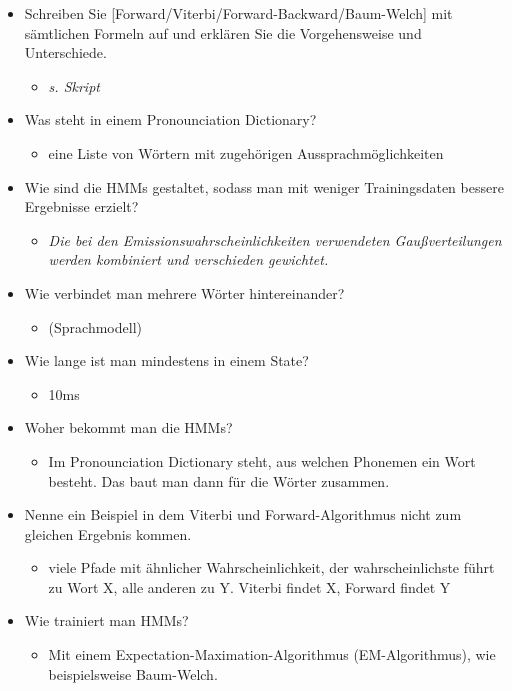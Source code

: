 \documentclass[11pt]{article}
\begin{document}
\begin{itemize}
\begin{itemize}
\end{itemize}
\item Schreiben Sie [Forward/Viterbi/Forward-Backward/Baum-Welch] mit sämtlichen Formeln auf und erklären Sie die Vorgehensweise und Unterschiede.
\begin{itemize}
\item \emph{s. Skript}
\end{itemize}
\item Was steht in einem Pronounciation Dictionary?
\begin{itemize}
\item eine Liste von Wörtern mit zugehörigen Aussprachmöglichkeiten
\end{itemize}
\item Wie sind die HMMs gestaltet, sodass man mit weniger Trainingsdaten bessere Ergebnisse erzielt?
\begin{itemize}
\item \emph{Die bei den Emissionswahrscheinlichkeiten verwendeten Gaußverteilungen werden kombiniert und verschieden gewichtet.}
\end{itemize}
\item Wie verbindet man mehrere Wörter hintereinander?
\begin{itemize}
\item (Sprachmodell)
\end{itemize}
\item Wie lange ist man mindestens in einem State? 
\begin{itemize}
\item 10ms
\end{itemize}
\item Woher bekommt man die HMMs? 
\begin{itemize}
\item Im Pronounciation Dictionary steht, aus welchen Phonemen ein Wort besteht. Das baut man dann für die Wörter zusammen.
\end{itemize}
\item Nenne ein Beispiel in dem Viterbi und Forward-Algorithmus nicht zum gleichen Ergebnis kommen. 
\begin{itemize}
\item viele Pfade mit ähnlicher Wahrscheinlichkeit, der wahrscheinlichste führt zu Wort X, alle anderen zu Y. Viterbi findet X, Forward findet Y
\end{itemize}
\item Wie trainiert man HMMs? 
\begin{itemize}
\item Mit einem Expectation-Maximation-Algorithmus (EM-Algorithmus), wie beispielsweise Baum-Welch.

\end{itemize}
\end{itemize}
\end{document}
